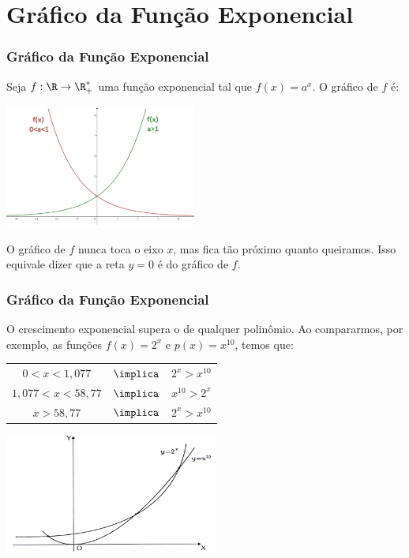 \documentclass[10pt]{beamer}
\begin{document}
\section{Gráfico da Função Exponencial}
\begin{frame}
\frametitle{Gráfico da Função Exponencial} 

\begin{exemplo}
Seja $f: \R \to \R_+^\ast$ uma função exponencial tal que $f(x) =
a^x$. O gráfico de $f$ é:
\begin{center}
\includegraphics[width=6.3cm]{figures/grafexp.jpg}
\end{center}
O gráfico de $f$ nunca toca o eixo $x$, mas fica tão próximo quanto
queiramos. Isso equivale dizer que a reta $y=0$ é  do
gráfico de $f$.
\end{exemplo}

\end{frame}




\begin{frame}
\frametitle{Gráfico da Função Exponencial} 

\begin{exemplo}
O crescimento exponencial supera o de qualquer polinômio. Ao
compararmos, por exemplo, as funções $f(x) = 2^x$ e
$p(x)=x^{10}$, temos que:\\
\begin{tabular}{ccc}
$0<x<1{,}077$ & $\implica$ & $2^x > x^{10}$\\
$1{,}077 < x < 58{,}77$ & $\implica$ & $x^{10} > 2^x$\\
$x>58{,}77$ & $\implica $& $2^x > x^{10}$
\end{tabular}
\begin{center}
\includegraphics[width=7cm]{figures/polXexp.jpg}
\end{center}
\end{exemplo}

\end{frame}
\end{document}
